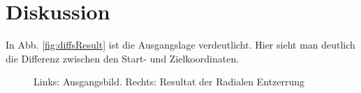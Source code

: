 
\section{Diskussion}
\label{sec:Auswertung}

In Abb. \ref{fig:diffsResult} ist die Ausgangslage verdeutlicht. Hier sieht man deutlich die Differenz zwischen den Start- und Zielkoordinaten. 

\begin{figure}[H]
	\caption{Links: Ausgangsbild. Rechts: Resultat der Radialen Entzerrung}
\end{figure}
	
